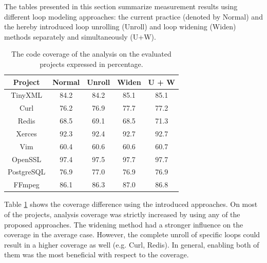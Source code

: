 \documentclass[oneside, a4paper, 12pt]{article}
\theoremstyle{definition}
\begin{document}
The tables presented in this section summarize measurement results using 
different loop modeling approaches: the current practice (denoted by Normal)
and the hereby introduced loop unrolling (Unroll) and loop widening (Widen)
methods separately and simultaneously (U+W).

\begin{table}[!htb]
	\centering
\begin{tabular}{ |c||c|c|c|c| } 
	\hline
	Project & Normal & Unroll & Widen & U + W \\
	\hline \hline
	TinyXML & 84.2 & 84.2 & 85.1 & 85.1 \\ 
	\hline
	Curl & 76.2 & 76.9 & 77.7 & 77.2 \\ 
	\hline
	Redis & 68.5 & 69.1 & 68.5 & 71.3 \\ 
	\hline
	Xerces & 92.3 & 92.4 & 92.7 & 92.7 \\ 
	\hline
	Vim & 60.4 & 60.6 &	60.6 & 60.7 \\ 
	\hline
	OpenSSL & 97.4 & 97.5 & 97.7 & 97.7 \\ 
	\hline
	PostgreSQL & 76.9 &	77.0 & 76.9 & 76.9 \\ 
	\hline
	FFmpeg & 86.1 & 86.3 & 87.0 & 86.8 \\	
	\hline
\end{tabular}
\caption{The code coverage of the analysis on the evaluated projects expressed 
in percentage.}\label{tab:cov}
\end{table}

Table \ref{tab:cov} shows the coverage difference using the introduced 
approaches. On most of the projects, analysis coverage was strictly increased by
using any of the proposed approaches. The widening method had a stronger 
influence on the coverage in the average case. However, the complete unroll of 
specific loops could result in a higher coverage as well (e.g. Curl, Redis).
In general, enabling both of them was the most beneficial with respect to the 
coverage.
\end{document}

